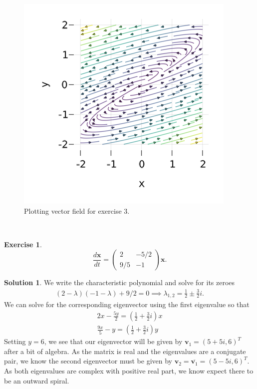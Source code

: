\documentclass[12pt]{article}
\renewcommand{\vec}[1]{\mathbf{#1}}
\theoremstyle{definition}
\newtheorem{exer}{Exercise}
\newtheorem{sol}{Solution}
\theoremstyle{remark}
\begin{document}
  \begin{figure}[h]
     \centering
     \includegraphics[width=0.8\linewidth]{figs/hw-1-exer-3.png}
     \caption{Plotting vector field for exercise 3.}%
     \label{fig:exer-3}
 \end{figure}


\newpage

\

\newpage

\begin{exer}
\begin{equation*}
\frac{d \vec{x}}{dt} 
=
\begin{pmatrix}
    2 & -5 / 2\\
    9 / 5 & -1
\end{pmatrix}
\vec{x}.
\end{equation*}
\end{exer}

\begin{sol}\leavevmode
     We write the characteristic polynomial and solve for its zeroes
     \begin{align*}
         (2 - \lambda) (-1 - \lambda) + 9 / 2 = 0 \implies \lambda_{1,2} = \frac{1}{2} \pm \frac{3}{2} i.
     \end{align*}
     We can solve for the corresponding eigenvector using the first eigenvalue so that 
     \begin{align*}
         2x - \frac{5y}{2}=  (\frac{1}{2} + \frac{3}{2}i )x\\
    \frac{9x}{5} - y = (\frac{1}{2} + \frac{3}{2}i)y
     \end{align*}
     Setting $y = 6$, we see that our eigenvector will be given by $\vec{v}_{1} = (5 + 5i, 6)^{T}$ after a bit of algebra. As the matrix is real and the eigenvalues are a conjugate pair, we know the second eigenvector must be given by $\vec{v}_{2} = \overline{\vec{v}_{1}} = (5 - 5i, 6)^{T}$. As both eigenvalues are complex with positive real part, we know expect there to be an outward spiral.
 \end{sol}
\end{document}
